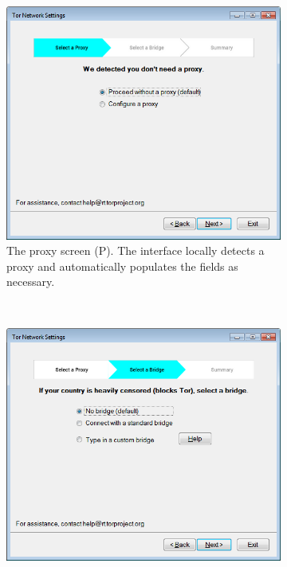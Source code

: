 \documentclass[USenglish,oneside,twocolumn]{article}
\begin{document}
\begin{figure}
\begin{subfigure}[b]{0.30\textwidth}
	\includegraphics[width=\textwidth]{screenshots/NEW-proxyYES.png}
	\centering\captionsetup{width=1.5\linewidth}%
	\caption{The proxy screen (P). The interface locally detects a proxy and automatically populates the fields as necessary.}
	\label{fig:new-proxy}
\end{subfigure}
~~~~~~~~~~
\begin{subfigure}[b]{0.30\textwidth}
	\includegraphics[width=\textwidth]{screenshots/NEW-bridgeSettings.png}
	\centering\captionsetup{width=1.5\linewidth}%

\end{subfigure}
\end{figure}
\end{document}
